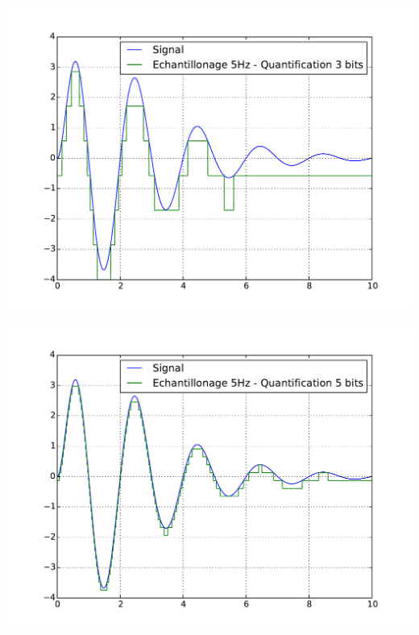\documentclass[10pt,fleqn]{article} %
\begin{document}
\begin{minipage}[c]{.32\linewidth}
\begin{center}
\includegraphics[width=\textwidth]{images/quan_1}
\end{center}
\end{minipage} \hfill
\begin{minipage}[c]{.32\linewidth}
\begin{center}
\includegraphics[width=\textwidth]{images/quan_2}
\end{center}
\end{minipage} \hfill
\end{document}
